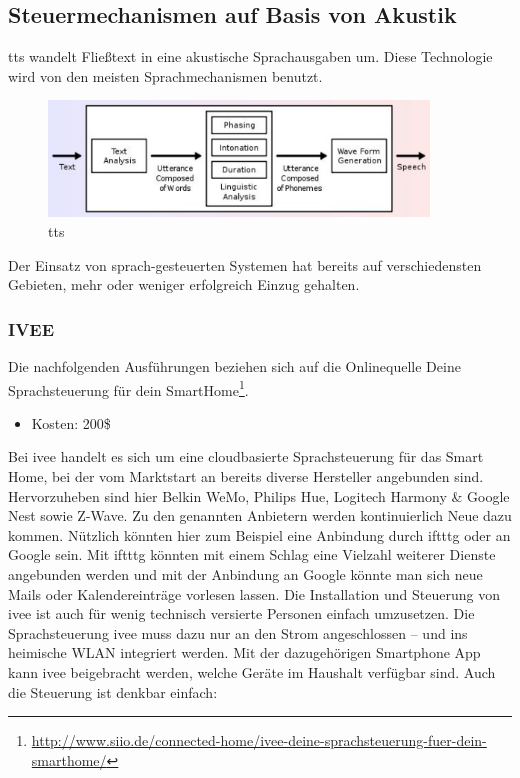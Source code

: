 \subsection{Steuermechanismen auf Basis von Akustik}
\acrfull{tts} wandelt Fließtext in eine akustische Sprachausgaben um. Diese Technologie wird von den meisten Sprachmechanismen benutzt.

\begin{figure}[h!]
	\centering
	\includegraphics[width=0.9\textwidth]{img/Feedback-Mechanismen/TTS.png}
	\caption{\gls{tts}}
	\label{fig:feedbackTTS}
\end{figure}

Der Einsatz von sprach-gesteuerten Systemen hat bereits auf verschiedensten Gebieten, mehr oder weniger erfolgreich Einzug gehalten.

\subsubsection{IVEE}
Die nachfolgenden Ausführungen beziehen sich auf die Onlinequelle \glqq Deine Sprachsteuerung für dein SmartHome\grqq\footnote{\url{http://www.siio.de/connected-home/ivee-deine-sprachsteuerung-fuer-dein-smarthome/}}.

\begin{itemize}
\item Kosten: 200\$
\end{itemize}

\noindent
Bei ivee handelt es sich um eine cloudbasierte Sprachsteuerung für das Smart Home, bei der vom Marktstart an bereits diverse Hersteller angebunden sind. Hervorzuheben sind hier Belkin WeMo, Philips Hue, Logitech Harmony \& Google Nest sowie Z-Wave. Zu den genannten Anbietern werden kontinuierlich Neue dazu kommen. Nützlich könnten hier zum Beispiel eine Anbindung durch \gls{iftttg} oder an Google sein. Mit \gls{iftttg} könnten mit einem Schlag eine Vielzahl weiterer Dienste angebunden werden und mit der Anbindung an Google könnte man sich neue Mails oder Kalendereinträge vorlesen lassen. Die Installation und Steuerung von ivee ist auch für wenig technisch versierte Personen einfach umzusetzen. Die Sprachsteuerung ivee muss dazu nur an den Strom angeschlossen – und ins heimische WLAN integriert werden. Mit der dazugehörigen Smartphone App kann ivee beigebracht werden, welche Geräte im Haushalt verfügbar sind. Auch die Steuerung ist denkbar einfach:

